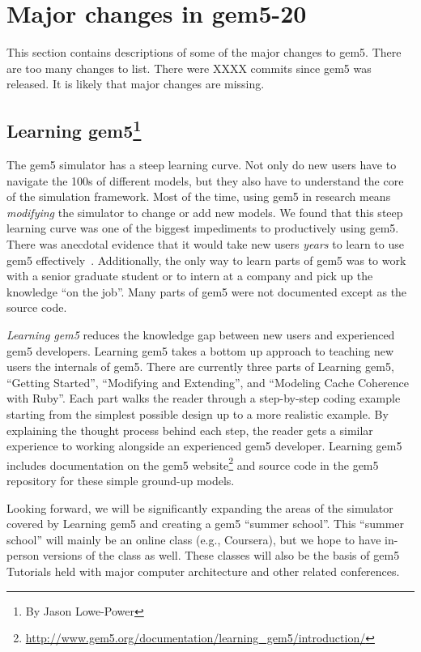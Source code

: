 \section{Major changes in gem5-20}
\label{sec:changes}

This section contains descriptions of some of the major changes to gem5.
There are too many changes to list.
There were XXXX commits since gem5 was released.
It is likely that major changes are missing.

\subsection[Learning gem5]{Learning gem5\footnote{By Jason Lowe-Power}}

The gem5 simulator has a steep learning curve.
Not only do new users have to navigate the 100s of different models, but they also have to understand the core of the simulation framework.
Most of the time, using gem5 in research means \emph{modifying} the simulator to change or add new models.
We found that this steep learning curve was one of the biggest impediments to productively using gem5.
There was anecdotal evidence that it would take new users \emph{years} to learn to use gem5 effectively~\cite{Power-gem5horrors-2015}.
Additionally, the only way to learn parts of gem5 was to work with a senior graduate student or to intern at a company and pick up the knowledge ``on the job''.
Many parts of gem5 were not documented except as the source code.

\emph{Learning gem5} reduces the knowledge gap between new users and experienced gem5 developers.
Learning gem5 takes a bottom up approach to teaching new users the internals of gem5.
There are currently three parts of Learning gem5, ``Getting Started'', ``Modifying and Extending'', and ``Modeling Cache Coherence with Ruby''.
Each part walks the reader through a step-by-step coding example starting from the simplest possible design up to a more realistic example.
By explaining the thought process behind each step, the reader gets a similar experience to working alongside an experienced gem5 developer.
Learning gem5 includes documentation on the gem5 website\footnote{\url{http://www.gem5.org/documentation/learning_gem5/introduction/}} and source code in the gem5 repository for these simple ground-up models.

Looking forward, we will be significantly expanding the areas of the simulator covered by Learning gem5 and creating a gem5 ``summer school''.
This ``summer school'' will mainly be an online class (e.g., Coursera), but we hope to have in-person versions of the class as well.
These classes will also be the basis of gem5 Tutorials held with major computer architecture and other related conferences.

